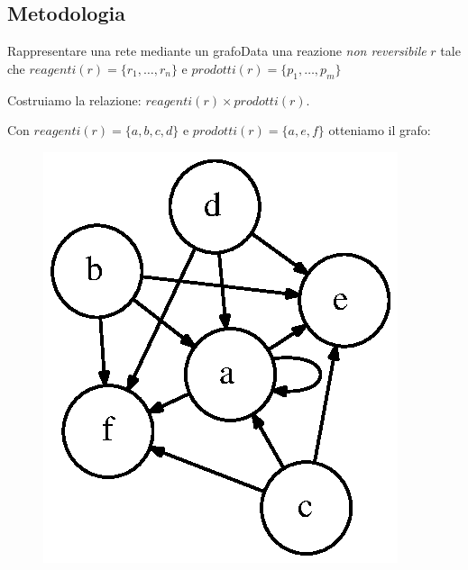 \documentclass{beamer}
\begin{document}
\subsection{Metodologia}

\begin{frame}{Rappresentare una rete mediante un grafo}{Data una
    reazione \emph{non reversibile} $r$ tale che $reagenti(r) = \{ r_{1},
    \ldots, r_{n} \}$ e $prodotti(r) = \{ p_{1}, \ldots, p_{m} \}$}

  Costruiamo la relazione: $reagenti(r) \times prodotti(r)$.
  
    \begin{example}
      Con $reagenti(r) = \{ a, b, c, d \}$ e $prodotti(r) = \{a, e,
      f\}$ otteniamo il grafo:
      \begin{figure}
        \centering
        \includegraphics[scale=.6]{images/non-reversible-reaction-example.dot.eps}
        \label{fig:non-reversible-reaction-mapping}
      \end{figure}
    \end{example}
\end{frame}
\end{document}

